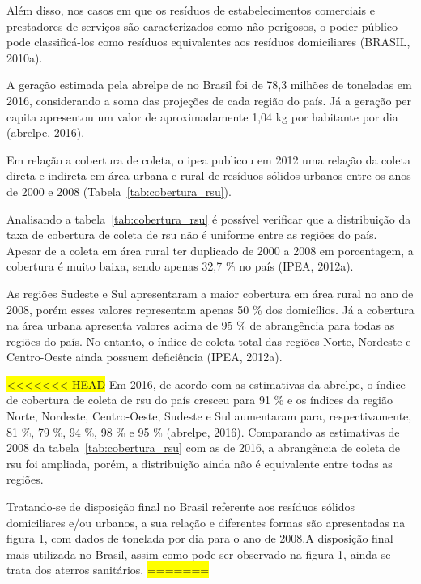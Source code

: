 	Além disso, nos casos em que os resíduos de estabelecimentos comerciais e prestadores de serviços são caracterizados como não perigosos, o poder público pode classificá-los como resíduos equivalentes aos resíduos domiciliares (BRASIL, 2010a).
	
	A geração estimada pela \gls{abrelpe} de  no Brasil foi de 78,3 milhões de toneladas em 2016, considerando a soma das projeções de cada região do país. Já a geração per capita apresentou um valor de aproximadamente 1,04 kg por habitante por dia (\gls{abrelpe}, 2016).
	
	Em relação a cobertura de coleta, o \gls{ipea} publicou em 2012 uma relação da coleta direta e indireta em área urbana e rural de resíduos sólidos urbanos entre os anos de 2000 e 2008 (Tabela~\ref{tab:cobertura_rsu}).
	
%	
	
	Analisando a tabela~\ref{tab:cobertura_rsu} é possível verificar que a distribuição da taxa de cobertura de coleta de \gls{rsu} não é uniforme entre as regiões do país. Apesar de a coleta em área rural ter duplicado de 2000 a 2008 em porcentagem, a cobertura é muito baixa, sendo apenas 32,7 \% no país (IPEA, 2012a).
	
	As regiões Sudeste e Sul apresentaram a maior cobertura em área rural no ano de 2008, porém esses valores representam apenas 50 \% dos domicílios. Já a cobertura na área urbana apresenta valores acima de 95 \% de abrangência para todas as regiões do país. No entanto, o índice de coleta total das regiões Norte, Nordeste e Centro-Oeste ainda possuem deficiência (IPEA, 2012a).
	
\colorbox{yellow}{<<<<<<< HEAD}
	Em 2016, de acordo com as estimativas da \gls{abrelpe}, o índice de cobertura de coleta de \gls{rsu} do país cresceu para 91 \% e os índices da região Norte, Nordeste, Centro-Oeste, Sudeste e Sul aumentaram para, respectivamente, 81 \%, 79 \%, 94 \%, 98 \% e 95 \% (\gls{abrelpe}, 2016). Comparando as estimativas de 2008 da tabela~\ref{tab:cobertura_rsu} com as de 2016, a abrangência de coleta de \gls{rsu} foi ampliada, porém, a distribuição ainda não é equivalente entre todas as regiões.
	
	Tratando-se de disposição final no Brasil referente aos resíduos sólidos domiciliares e/ou urbanos, a sua relação e diferentes formas são apresentadas na figura 1, com dados de tonelada por dia para o ano de 2008.A disposição final mais utilizada no Brasil, assim como pode ser observado na figura 1, ainda se trata dos aterros sanitários. 
\colorbox{yellow}{=======}

